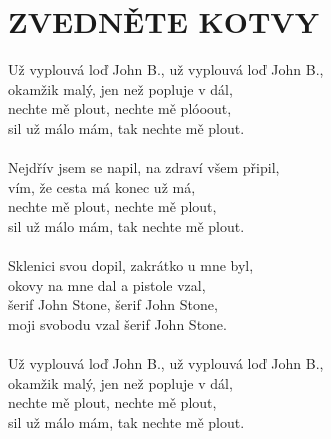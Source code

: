 \section*{\Huge ZVEDNĚTE KOTVY}

Už vyplouvá loď John B., už vyplouvá loď John B.,\\
okamžik malý, jen než popluje v dál,\\
nechte mě plout, nechte mě plóoout,\\
sil už málo mám, tak nechte mě plout.\\
\\
Nejdřív jsem se napil, na zdraví všem připil,\\
vím, že cesta má konec už má,\\
nechte mě plout, nechte mě plout,\\
sil už málo mám, tak nechte mě plout.\\
\\
Sklenici svou dopil, zakrátko u mne byl,\\
okovy na mne dal a pistole vzal,\\
šerif John Stone, šerif John Stone,\\
moji svobodu vzal šerif John Stone.\\
\\
Už vyplouvá loď John B., už vyplouvá loď John B.,\\
okamžik malý, jen než popluje v dál,\\
nechte mě plout, nechte mě plout,\\
sil už málo mám, tak nechte mě plout.

\newpage
